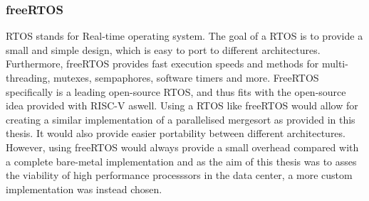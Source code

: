 \subsubsection*{freeRTOS}
RTOS stands for Real-time operating system. The goal of a RTOS is to provide a
small and simple design, which is easy to port to different architectures.
Furthermore, freeRTOS provides fast execution speeds and methods for
multi-threading, mutexes, sempaphores, software timers and more. FreeRTOS
specifically is a leading open-source RTOS, and thus fits with the open-source
idea provided with RISC-V aswell. Using a RTOS like freeRTOS would allow for
creating a similar implementation of a parallelised mergesort as provided in
this thesis. It would also provide easier portability between different
architectures. However, using freeRTOS would always provide a small overhead
compared with a complete bare-metal implementation and as the aim of this thesis
was to asses the viability of high performance processsors in the data center,
a more custom implementation was instead chosen.


